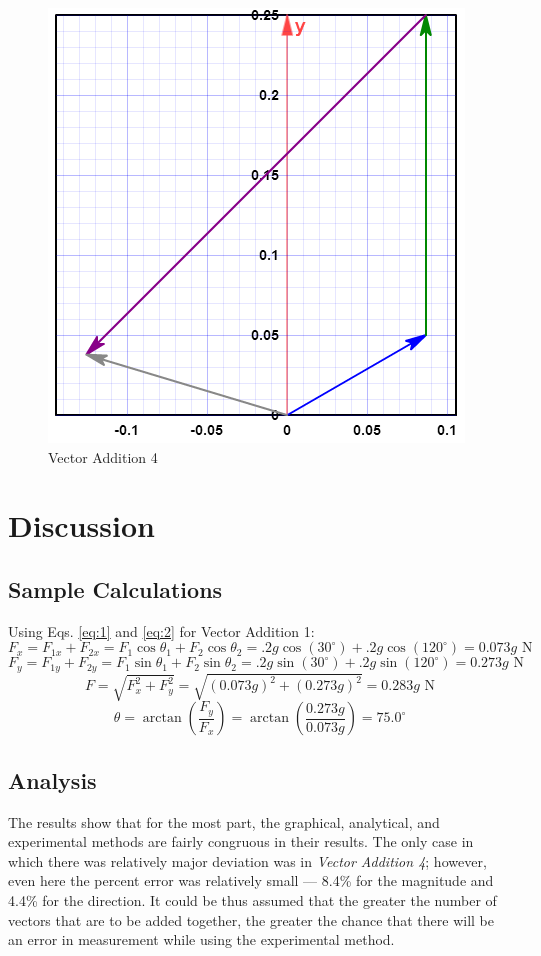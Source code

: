 \documentclass[11pt, titlepage]{article}
\begin{document}
\begin{figure}
\includegraphics[scale=.5, angle=0]{lab03_v5.png}
\caption{Vector Addition 4 \label{fig:v5}}
\end{figure}

\pagebreak
\section*{Discussion}
\subsection*{Sample Calculations}
Using Eqs. \ref{eq:1} and \ref{eq:2} for Vector Addition 1:
$$F_x = F_{1x} + F_{2x} = F_1\cos\theta_1 + F_2\cos\theta_2 = .2g\cos(30^\circ) + .2g\cos(120^\circ) = 0.073g \text{ N}$$
$$F_y = F_{1y} + F_{2y} = F_1\sin\theta_1 + F_2\sin\theta_2 = .2g\sin(30^\circ) + .2g\sin(120^\circ) = 0.273g \text{ N}$$
$$F = \sqrt{F_x^2 + F_y^2} = \sqrt{(0.073g)^2+(0.273g)^2} = 0.283g \text{ N}$$
$$\theta = \arctan({\frac{F_y}{F_x}}) = \arctan(\frac{0.273g}{0.073g}) = 75.0^\circ$$

\pagebreak
\subsection*{Analysis}
The results show that for the most part, the graphical, analytical, and experimental methods are fairly congruous in their results. The only case in which there was relatively major deviation was in \emph{Vector Addition 4}; however, even here the percent error was relatively small --- 8.4\% for the magnitude and 4.4\% for the direction. It could be thus assumed that the greater the number of vectors that are to be added together, the greater the chance that there will be an error in measurement while using the experimental method.
\end{document}
